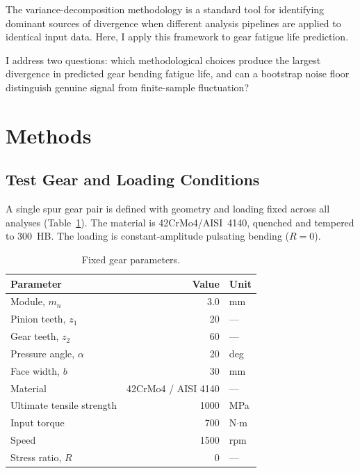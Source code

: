 \documentclass[12pt,a4paper]{article}
\begin{document}
The variance-decomposition methodology is a standard tool for identifying
dominant sources of divergence when different analysis pipelines are
applied to identical input data. Here, I apply this framework to
gear fatigue life prediction.

I address two questions: which methodological choices produce the
largest divergence in predicted gear bending fatigue life, and can a
bootstrap noise floor distinguish genuine signal from finite-sample
fluctuation?

\section{Methods}
\label{sec:methods}

\subsection{Test Gear and Loading Conditions}

A single spur gear pair is defined with geometry and loading fixed
across all analyses (Table~\ref{tab:gear}). The material is
42CrMo4/AISI~4140, quenched and tempered to 300~HB. The loading is
constant-amplitude pulsating bending ($R=0$).

\begin{table}[h]
\centering
\caption{Fixed gear parameters.}
\label{tab:gear}
\begin{tabular}{lrl}
\toprule
Parameter & Value & Unit \\
\midrule
Module, $m_n$ & 3.0 & mm \\
Pinion teeth, $z_1$ & 20 & --- \\
Gear teeth, $z_2$ & 60 & --- \\
Pressure angle, $\alpha$ & 20 & deg \\
Face width, $b$ & 30 & mm \\
Material & 42CrMo4 / AISI 4140 & --- \\
Ultimate tensile strength & 1000 & MPa \\
Input torque & 700 & N$\cdot$m \\
Speed & 1500 & rpm \\
Stress ratio, $R$ & 0 & --- \\
\bottomrule
\end{tabular}
\end{table}
\end{document}
